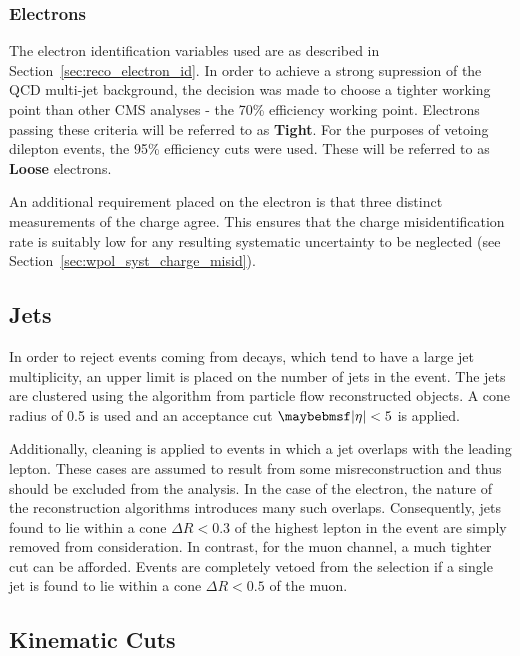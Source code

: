 \subsubsection{Electrons}
\label{sec:wpol_electronid}
The electron identification variables used are as described in
Section~\ref{sec:reco_electron_id}. In order to achieve a strong supression of
the \ac{QCD} multi-jet background, the decision was made to choose a tighter
working point than other \ac{CMS} analyses - the 70\% efficiency working
point. Electrons passing these criteria will be referred to as
\textbf{Tight}. For the purposes of vetoing dilepton events, the 95\% efficiency
cuts were used. These will be referred to as \textbf{Loose} electrons.

An additional requirement placed on the electron is that three distinct
measurements of the charge agree. This ensures that the charge misidentification
rate is suitably low for any resulting systematic uncertainty to be neglected
(see Section~\ref{sec:wpol_syst_charge_misid}).

\subsection{Jets}
\label{sec:wpol_jets}
In order to reject events coming from \ttbar decays, which tend to have a large
jet multiplicity, an upper limit is placed on the number of jets in the
event. The jets are clustered using the \antikT algorithm from particle flow
reconstructed objects. A cone radius of 0.5 is used and an acceptance cut
$\modeta < 5$ is applied.

Additionally, cleaning is applied to events in which a jet overlaps with the
leading lepton. These cases are assumed to result from some misreconstruction
and thus should be excluded from the analysis. In the case of the electron, the
nature of the reconstruction algorithms introduces many such
overlaps. Consequently, jets found to lie within a cone $\Delta R < 0.3$ of the
highest \Pt lepton in the event are simply removed from consideration. In
contrast, for the muon channel, a much tighter cut can be afforded. Events are
completely vetoed from the selection if a single jet is found to lie within a
cone $\Delta R < 0.5$ of the muon.

\subsection{Kinematic Cuts}
